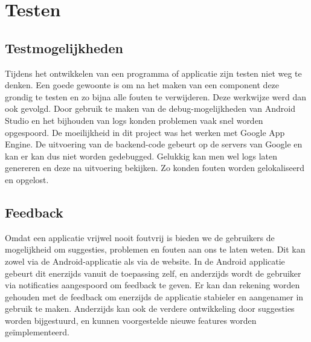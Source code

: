 \chapter{Testen}%
\section{Testmogelijkheden}
Tijdens het ontwikkelen van een programma of applicatie zijn testen niet weg te denken. Een goede gewoonte is om na het maken van een component deze grondig te testen en zo bijna alle fouten te verwijderen.
Deze werkwijze werd dan ook gevolgd. Door gebruik te maken van de debug-mogelijkheden van Android Studio en het bijhouden van logs konden problemen vaak snel worden opgespoord. De moeilijkheid in dit project was het werken met Google App Engine. De uitvoering van de backend-code gebeurt op de servers van Google en kan er kan dus niet worden gedebugged. Gelukkig kan men wel logs laten genereren en deze na uitvoering bekijken.
Zo konden fouten worden gelokaliseerd en opgelost.

\section{Feedback}
Omdat een applicatie vrijwel nooit foutvrij is bieden we de gebruikers de mogelijkheid om suggesties, problemen en fouten aan ons te laten weten.
Dit kan zowel via de Android-applicatie als via de website. In de Android applicatie gebeurt dit enerzijds vanuit de toepassing zelf, en anderzijds wordt de gebruiker via notificaties aangespoord om feedback te geven.
Er kan dan rekening worden gehouden met de feedback om enerzijds de applicatie stabieler en aangenamer in gebruik te maken. Anderzijds kan ook de verdere ontwikkeling door suggesties worden bijgestuurd, en kunnen voorgestelde nieuwe features worden geïmplementeerd.
